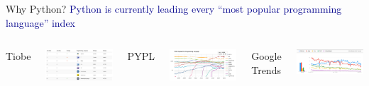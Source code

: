 \documentclass[aspectratio=169]{beamer}
\begin{document}
\begin{frame}{Why Python?}
\large
\vspace{0.25 cm}
\textcolor{darkblue}{\mbox{\hspace{-0.5 cm}}Python is currently leading every ``most popular programming language'' index}

\vspace{0.25 cm}
\begin{columns}[t]
\centering Tiobe

\vspace{0.1 cm}
\includegraphics[width=\linewidth]{python-rankings-tiobe-2022.png}

\centering PYPL

\vspace{0.1 cm}
\includegraphics[width=\linewidth]{python-rankings-pypl-2022.png}

\centering Google Trends

\vspace{0.1 cm}
\includegraphics[width=\linewidth]{python-rankings-googletrends-2022.png}
\end{columns}


\end{frame}
\end{document}
